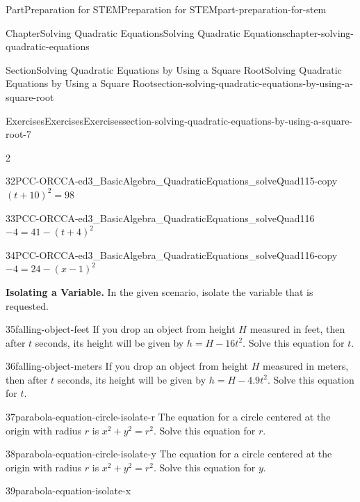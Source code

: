 \documentclass[twoside,10pt,]{book}
\numberwithin{equation}{section}
\begin{document}
\begin{partptx}{Part}{Preparation for STEM}{}{Preparation for STEM}{}{}{part-preparation-for-stem}
\begin{chapterptx}{Chapter}{Solving Quadratic Equations}{}{Solving Quadratic Equations}{}{}{chapter-solving-quadratic-equations}
\begin{sectionptx}{Section}{Solving Quadratic Equations by Using a Square Root}{}{Solving Quadratic Equations by Using a Square Root}{}{}{section-solving-quadratic-equations-by-using-a-square-root}
\begin{exercises-subsection}{Exercises}{Exercises}{}{Exercises}{}{}{section-solving-quadratic-equations-by-using-a-square-root-7}
\begin{exercisegroupcol}{2}
\begin{divisionexerciseegcol}{32}{}{}{PCC-ORCCA-ed3_BasicAlgebra_QuadraticEquations_solveQuad115-copy}
\((t+10)^2 = 98\)%
\end{divisionexerciseegcol}%
\begin{divisionexerciseegcol}{33}{}{}{PCC-ORCCA-ed3_BasicAlgebra_QuadraticEquations_solveQuad116}%
\(-4 = 41 - (t+4)^2\)%
\end{divisionexerciseegcol}%
\begin{divisionexerciseegcol}{34}{}{}{PCC-ORCCA-ed3_BasicAlgebra_QuadraticEquations_solveQuad116-copy}%
\(-4 = 24 - (x - 1)^2\)%
\end{divisionexerciseegcol}%
\end{exercisegroupcol}
\par\medskip\noindent
\par\medskip\noindent%
\textbf{Isolating a Variable.}\space\space%
In the given scenario, isolate the variable that is requested.%
\begin{exercisegroup}
\begin{divisionexerciseeg}{35}{}{}{falling-object-feet}%
If you drop an object from height \(H\) measured in feet, then after \(t\) seconds, its height will be given by \(h = H - 16t^2\text{.}\) Solve this equation for \(t\text{.}\)%
\end{divisionexerciseeg}%
\begin{divisionexerciseeg}{36}{}{}{falling-object-meters}%
If you drop an object from height \(H\) measured in meters, then after \(t\) seconds, its height will be given by \(h = H - 4.9t^2\text{.}\) Solve this equation for \(t\text{.}\)%
\end{divisionexerciseeg}%
\begin{divisionexerciseeg}{37}{}{}{parabola-equation-circle-isolate-r}%
The equation for a circle centered at the origin with radius \(r\) is \(x^2+y^2=r^2\text{.}\) Solve this equation for \(r\text{.}\)%
\end{divisionexerciseeg}%
\begin{divisionexerciseeg}{38}{}{}{parabola-equation-circle-isolate-y}%
The equation for a circle centered at the origin with radius \(r\) is \(x^2+y^2=r^2\text{.}\) Solve this equation for \(y\text{.}\)%
\end{divisionexerciseeg}%
\begin{divisionexerciseeg}{39}{}{}{parabola-equation-isolate-x}%

\end{divisionexerciseeg}
\end{exercisegroup}
\end{exercises-subsection}
\end{sectionptx}
\end{chapterptx}
\end{partptx}
\end{document}
